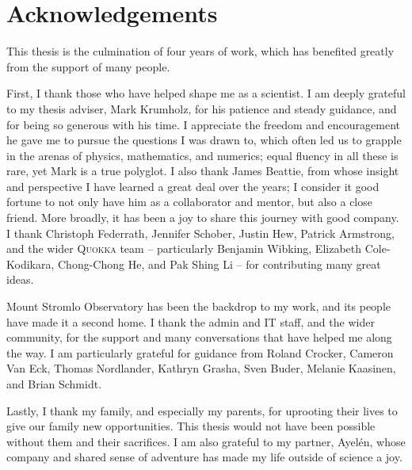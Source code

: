 \chapter*{Acknowledgements}
\vspace{-0.5cm}

This thesis is the culmination of four years of work, which has benefited greatly from the support of many people.

First, I thank those who have helped shape me as a scientist. I am deeply grateful to my thesis adviser, Mark Krumholz, for his patience and steady guidance, and for being so generous with his time. I appreciate the freedom and encouragement he gave me to pursue the questions I was drawn to, which often led us to grapple in the arenas of physics, mathematics, and numerics; equal fluency in all these is rare, yet Mark is a true polyglot. I also thank James Beattie, from whose insight and perspective I have learned a great deal over the years; I consider it good fortune to not only have him as a collaborator and mentor, but also a close friend. More broadly, it has been a joy to share this journey with good company. I thank Christoph Federrath, Jennifer Schober, Justin Hew, Patrick Armstrong, and the wider \textsc{Quokka} team -- particularly Benjamin Wibking, Elizabeth Cole-Kodikara, Chong-Chong He, and Pak Shing Li -- for contributing many great ideas.

Mount Stromlo Observatory has been the backdrop to my work, and its people have made it a second home. I thank the admin and IT staff, and the wider community, for the support and many conversations that have helped me along the way. I am particularly grateful for guidance from Roland Crocker, Cameron Van Eck, Thomas Nordlander, Kathryn Grasha, Sven Buder, Melanie Kaasinen, and Brian Schmidt.

Lastly, I thank my family, and especially my parents, for uprooting their lives to give our family new opportunities. This thesis would not have been possible without them and their sacrifices. I am also grateful to my partner, Ayel\'en, whose company and shared sense of adventure has made my life outside of science a joy.
